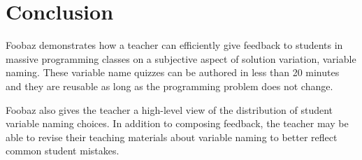 \section{Conclusion}

Foobaz demonstrates how a teacher can efficiently give feedback to students in massive programming classes on a subjective aspect of solution variation, variable naming. These variable name quizzes can be authored in less than 20 minutes and they are reusable as long as the programming problem does not change. 

Foobaz also gives the teacher a high-level view of the distribution of student variable naming choices. In addition to composing feedback, the teacher may be able to revise their teaching materials about variable naming to better reflect common student mistakes.



